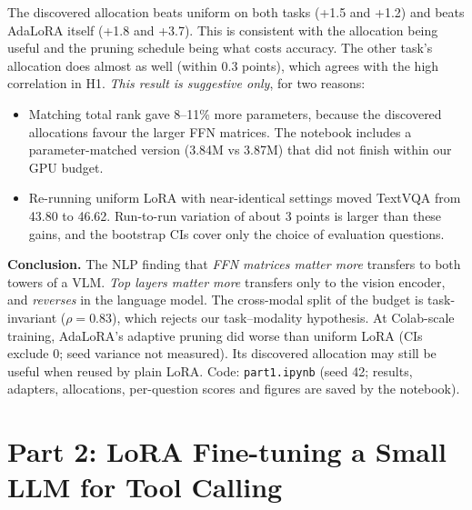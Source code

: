 \documentclass[12pt,a4paper]{article}
\begin{document}
The discovered allocation beats uniform on both tasks (+1.5 and +1.2) and beats AdaLoRA itself (+1.8 and +3.7).
This is consistent with the allocation being useful and the pruning schedule being what costs accuracy. The other
task's allocation does almost as well (within 0.3 points), which agrees with the high correlation in H1.
\emph{This result is suggestive only}, for two reasons:
\begin{itemize}
    \item Matching total rank gave 8--11\% more parameters, because the discovered allocations favour the larger FFN
    matrices. The notebook includes a parameter-matched version (3.84M vs 3.87M) that did not finish within our
    GPU budget.
    \item Re-running uniform LoRA with near-identical settings moved TextVQA from 43.80 to 46.62. Run-to-run variation
    of about 3 points is larger than these gains, and the bootstrap CIs cover only the choice of evaluation questions.
\end{itemize}

\textbf{Conclusion.} The NLP finding that \emph{FFN matrices matter more} transfers to both towers of a VLM.
\emph{Top layers matter more} transfers only to the vision encoder, and \emph{reverses} in the language model.
The cross-modal split of the budget is task-invariant ($\rho=0.83$), which rejects our task--modality hypothesis.
At Colab-scale training, AdaLoRA's adaptive pruning did worse than uniform LoRA (CIs exclude 0; seed variance not measured). Its discovered
allocation may still be useful when reused by plain LoRA. Code: \texttt{part1.ipynb} (seed 42; results, adapters,
allocations, per-question scores and figures are saved by the notebook).

\endgroup
\restoregeometry


\begingroup
\titlespacing*{\section}{0pt}{0pt}{6pt}
\titlespacing*{\subsection}{0pt}{4pt}{1pt}
\setlength{\topsep}{2pt}
\section{Part 2: LoRA Fine-tuning a Small LLM for Tool Calling}
\footnotesize
\setlength{\parskip}{1pt}
\setlength{\parindent}{0pt}
\end{document}
